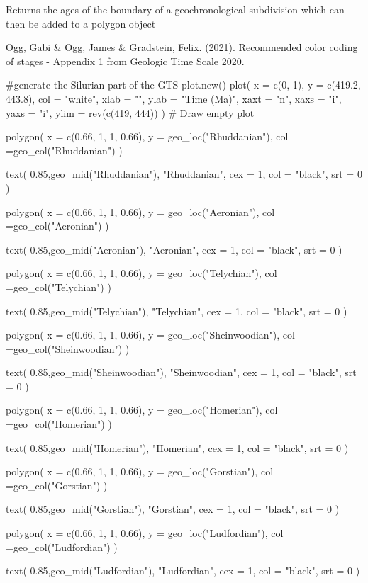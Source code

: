 \documentclass[a4paper]{book}
\begin{document}
%
\begin{Value}
Returns the ages of the boundary of a geochronological subdivision
which can then be added to a polygon object
\end{Value}
%
\begin{References}
Ogg, Gabi \& Ogg, James \& Gradstein, Felix. (2021).
Recommended color coding of stages - Appendix 1
from Geologic Time Scale 2020.
\end{References}
%
\begin{Examples}
\begin{ExampleCode}
#generate the Silurian part of the GTS
plot.new()
plot(
 x = c(0, 1),
 y = c(419.2, 443.8),
 col = "white",
 xlab = "",
 ylab = "Time (Ma)",
 xaxt = "n",
 xaxs = "i",
 yaxs = "i",
 ylim = rev(c(419, 444))
)            # Draw empty plot

polygon(
 x = c(0.66, 1, 1, 0.66),
 y = geo_loc("Rhuddanian"),
 col =geo_col("Rhuddanian")
)

text(
 0.85,geo_mid("Rhuddanian"),
 "Rhuddanian",
 cex = 1,
 col = "black",
 srt = 0
)

polygon(
 x = c(0.66, 1, 1, 0.66),
 y = geo_loc("Aeronian"),
 col =geo_col("Aeronian")
)

text(
 0.85,geo_mid("Aeronian"),
 "Aeronian",
 cex = 1,
 col = "black",
 srt = 0
)

polygon(
 x = c(0.66, 1, 1, 0.66),
 y = geo_loc("Telychian"),
 col =geo_col("Telychian")
)

text(
 0.85,geo_mid("Telychian"),
 "Telychian",
 cex = 1,
 col = "black",
 srt = 0
)

polygon(
 x = c(0.66, 1, 1, 0.66),
 y = geo_loc("Sheinwoodian"),
 col =geo_col("Sheinwoodian")
)

text(
 0.85,geo_mid("Sheinwoodian"),
 "Sheinwoodian",
 cex = 1,
 col = "black",
 srt = 0
)


polygon(
 x = c(0.66, 1, 1, 0.66),
 y = geo_loc("Homerian"),
 col =geo_col("Homerian")
)

text(
 0.85,geo_mid("Homerian"),
 "Homerian",
 cex = 1,
 col = "black",
 srt = 0
)


polygon(
 x = c(0.66, 1, 1, 0.66),
 y = geo_loc("Gorstian"),
 col =geo_col("Gorstian")
)

text(
 0.85,geo_mid("Gorstian"),
 "Gorstian",
 cex = 1,
 col = "black",
 srt = 0
)

polygon(
 x = c(0.66, 1, 1, 0.66),
 y = geo_loc("Ludfordian"),
 col =geo_col("Ludfordian")
)

text(
 0.85,geo_mid("Ludfordian"),
 "Ludfordian",
 cex = 1,
 col = "black",
 srt = 0
)


\end{ExampleCode}
\end{Examples}
\end{document}
